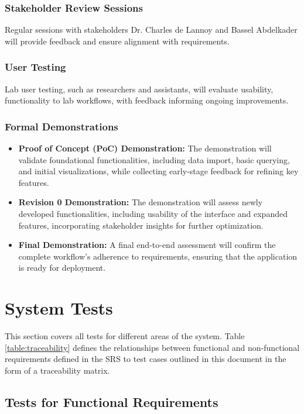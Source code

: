\documentclass[12pt, titlepage]{article}
\begin{document}
\subsubsection{Stakeholder Review Sessions}
Regular sessions with stakeholders Dr. Charles de Lannoy and Bassel Abdelkader
will provide feedback and ensure alignment with requirements.

\subsubsection{User Testing}
Lab user testing, such as researchers and assistants, will evaluate usability,
functionality to lab workflows, with feedback informing ongoing improvements.
\subsubsection{Formal Demonstrations}
\begin{itemize}
    \item \textbf{Proof of Concept (PoC) Demonstration:} The demonstration will
    validate foundational functionalities, including data import, basic
    querying, and initial visualizations, while collecting early-stage feedback
    for refining key features.
    \item \textbf{Revision 0 Demonstration:} The demonstration will assess newly
    developed functionalities, including usability of the interface and expanded
    features, incorporating stakeholder insights for further optimization.
    \item \textbf{Final Demonstration:} A final end-to-end assessment will
    confirm the complete workflow’s adherence to requirements, ensuring that the
    application is ready for deployment.
\end{itemize}



\section{System Tests}
This section covers all tests for different areas of the system. Table \ref{table:traceability}
defines the relationships between functional and non-functional requirements defined
in the SRS to test cases outlined in this document in the form of a traceability matrix.

\subsection{Tests for Functional Requirements}
\end{document}
